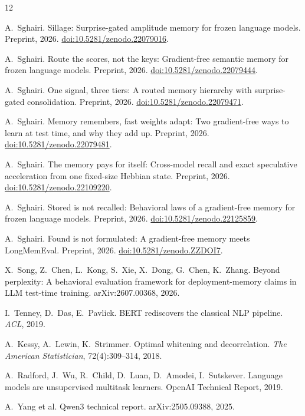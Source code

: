 \documentclass[11pt]{article}
\begin{document}
\begin{thebibliography}{12}\small

 A.~Sghairi. Sillage: Surprise-gated amplitude memory for frozen language models. Preprint, 2026. \href{https://doi.org/10.5281/zenodo.22079016}{doi:10.5281/zenodo.22079016}.

 A.~Sghairi. Route the scores, not the keys: Gradient-free semantic memory for frozen language models. Preprint, 2026. \href{https://doi.org/10.5281/zenodo.22079444}{doi:10.5281/zenodo.22079444}.

 A.~Sghairi. One signal, three tiers: A routed memory hierarchy with surprise-gated consolidation. Preprint, 2026. \href{https://doi.org/10.5281/zenodo.22079471}{doi:10.5281/zenodo.22079471}.

 A.~Sghairi. Memory remembers, fast weights adapt: Two gradient-free ways to learn at test time, and why they add up. Preprint, 2026. \href{https://doi.org/10.5281/zenodo.22079481}{doi:10.5281/zenodo.22079481}.

 A.~Sghairi. The memory pays for itself: Cross-model recall and exact speculative acceleration from one fixed-size Hebbian state. Preprint, 2026. \href{https://doi.org/10.5281/zenodo.22109220}{doi:10.5281/zenodo.22109220}.

 A.~Sghairi. Stored is not recalled: Behavioral laws of a gradient-free memory for frozen language models. Preprint, 2026. \href{https://doi.org/10.5281/zenodo.22125859}{doi:10.5281/zenodo.22125859}.

 A.~Sghairi. Found is not formulated: A gradient-free memory meets LongMemEval. Preprint, 2026. \href{https://doi.org/10.5281/zenodo.ZZDOI7}{doi:10.5281/zenodo.ZZDOI7}.

 X.~Song, Z.~Chen, L.~Kong, S.~Xie, X.~Dong, G.~Chen, K.~Zhang. Beyond perplexity: A behavioral evaluation framework for deployment-memory claims in LLM test-time training. arXiv:2607.00368, 2026.

 I.~Tenney, D.~Das, E.~Pavlick. BERT rediscovers the classical NLP pipeline. \emph{ACL}, 2019.

 A.~Kessy, A.~Lewin, K.~Strimmer. Optimal whitening and decorrelation. \emph{The American Statistician}, 72(4):309--314, 2018.

 A.~Radford, J.~Wu, R.~Child, D.~Luan, D.~Amodei, I.~Sutskever. Language models are unsupervised multitask learners. OpenAI Technical Report, 2019.

 A.~Yang et al. Qwen3 technical report. arXiv:2505.09388, 2025.

\end{thebibliography}
\end{document}
